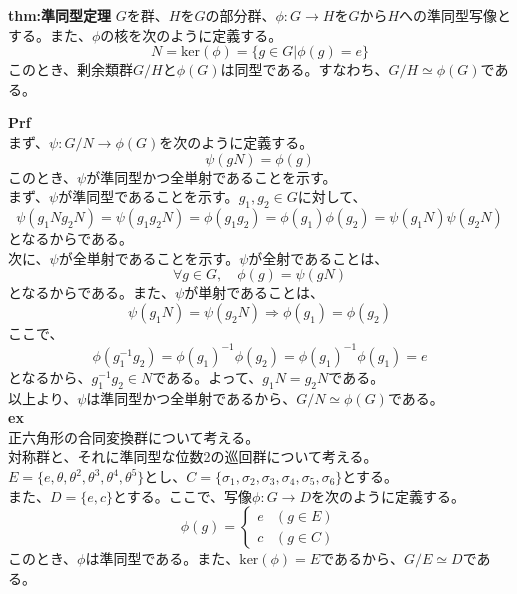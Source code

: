 \documentclass[a4paper,11pt]{jsarticle}
\begin{document}
\begin{itembox}[l]{\textbf{thm:準同型定理}}
    $G$を群、$H$を$G$の部分群、$\phi:G \to H$を$G$から$H$への準同型写像とする。また、$\phi$の核を次のように定義する。
    \begin{equation}
        N=\text{ker}(\phi) = \{g \in G | \phi(g) = e\}
    \end{equation}
    このとき、剰余類群$G/H$と$\phi(G)$は同型である。すなわち、$G/H \simeq \phi(G)$である。
\end{itembox}
\textbf{Prf}\\
まず、$\psi:G/N \to \phi(G)$を次のように定義する。
\begin{equation}
    \psi(gN) = \phi(g)
\end{equation}
このとき、$\psi$が準同型かつ全単射であることを示す。\\
まず、$\psi$が準同型であることを示す。$g_1,g_2 \in G$に対して、
\begin{equation}
    \psi(g_1N g_2N) = \psi(g_1g_2N) = \phi(g_1g_2) = \phi(g_1)\phi(g_2) = \psi(g_1N)\psi(g_2N)
\end{equation}
となるからである。\\
次に、$\psi$が全単射であることを示す。$\psi$が全射であることは、
\begin{equation}
    \forall g \in G, \quad \phi(g) = \psi(gN)
\end{equation}
となるからである。また、$\psi$が単射であることは、
\begin{equation}
    \psi(g_1N) = \psi(g_2N) \Rightarrow \phi(g_1) = \phi(g_2) 
\end{equation}
ここで、
\begin{equation}
    \phi(g_1 ^{-1}g_2) = \phi(g_1)^{-1}\phi(g_2) = \phi(g_1)^{-1}\phi(g_1) = e
\end{equation}
となるから、$g_1 ^{-1}g_2 \in N$である。よって、$g_1N = g_2N$である。\\
以上より、$\psi$は準同型かつ全単射であるから、$G/N \simeq \phi(G)$である。\\
\textbf{ex}\\
正六角形の合同変換群について考える。\\
対称群と、それに準同型な位数2の巡回群について考える。\\
$E=\{e,\theta,\theta^2,\theta^3,\theta^4,\theta^5\}$とし、$C=\{\sigma_1,\sigma_2,\sigma_3,\sigma_4,\sigma_5,\sigma_6\}$とする。\\
また、$D=\{e,c\}$とする。ここで、写像$\phi:G \to D$を次のように定義する。
\begin{equation}
    \phi(g) = \begin{cases}
        e & (g \in E)\\
        c & (g \in C)
    \end{cases}
\end{equation}
このとき、$\phi$は準同型である。また、$\text{ker}(\phi) = E$であるから、$G/E \simeq D$である。\\
\end{document}
